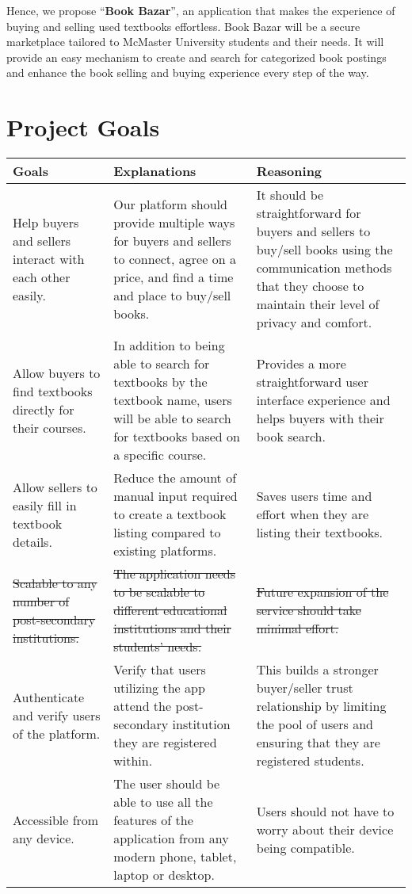 \documentclass[fullpage]{article}
\newcommand{\bc}{\begin{center}}
\newcommand{\ec}{\end{center}}
\begin{document}
Hence, we propose “\textbf{Book Bazar}”, an application that makes the experience of buying and selling used textbooks effortless. Book Bazar will be a secure marketplace tailored to McMaster University students and their needs. It will provide an easy mechanism to create and search for categorized book postings and enhance the book selling and buying experience every step of the way.


\section{Project Goals}
\bc

\begin{tabular}{| p{4cm}| p{4cm}| p{4cm}|}

\hline
 \rowcolor{lightgray} 
\textbf{Goals} & \textbf{Explanations} &\textbf{Reasoning}\\
\hline
Help buyers and sellers interact with each other easily. & Our platform should provide multiple ways for buyers and sellers to connect, agree on a price, and find a time and place to buy/sell books. & It should be straightforward for buyers and sellers to buy/sell books using the communication methods that they choose to maintain their level of privacy and comfort.\\
\hline
 Allow buyers to find textbooks directly for their courses. & In addition to being able to search for textbooks by the textbook name, users will be able to search for textbooks based on a specific course. & Provides a more straightforward user interface experience and helps buyers with their book search.\\
\hline
Allow sellers to easily fill in textbook details. & Reduce the amount of manual input required to create a textbook listing compared to existing platforms. & Saves users time and effort when they are listing their textbooks.\\
\hline
\sout{Scalable to any number of post-secondary institutions.} & \sout{The application needs to be scalable to different educational institutions and their students’ needs.} & \sout{Future expansion of the service should take minimal effort.}\\
\hline
Authenticate and verify users of the platform. & Verify that users utilizing the app attend the post-secondary institution they are registered within. & This builds a stronger buyer/seller trust relationship by limiting the pool of users and ensuring that they are registered students.\\
\hline
Accessible from any device. & The user should be able to use all the features of the application from any modern phone, tablet, laptop or desktop. & Users should not have to worry about their device being compatible.\\
\hline

\end{tabular}
\ec
\end{document}
